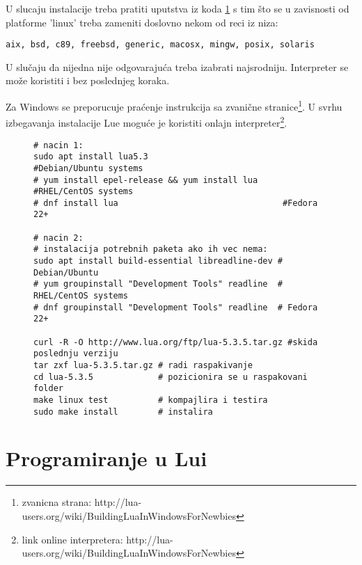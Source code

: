 \documentclass[a4paper]{article}
\begin{document}
U slucaju instalacije treba pratiti uputstva iz koda \ref{kod_instalacija} s tim što se u zavisnosti od platforme 'linux' treba zameniti doslovno nekom od reci iz niza:
\begin{verbatim}
aix, bsd, c89, freebsd, generic, macosx, mingw, posix, solaris
\end{verbatim}
 U slučaju da nijedna nije odgovarajuća treba izabrati najsrodniju. Interpreter se može koristiti i bez poslednjeg koraka.\cite{lua_org}

 Za Windows se preporucuje praćenje instrukcija sa zvanične stranice\footnote{zvanicna strana: http://lua-users.org/wiki/BuildingLuaInWindowsForNewbies}. U svrhu izbegavanja instalacije Lue moguće je koristiti onlajn interpreter\footnote{link online interpretera: http://lua-users.org/wiki/BuildingLuaInWindowsForNewbies}.

\begin{figure}

\begin{lstlisting}[caption={Instalacija iz terminala na linuxu},frame=single, label=simple]
# nacin 1:
sudo apt install lua5.3	                      #Debian/Ubuntu systems 
# yum install epel-release && yum install lua	#RHEL/CentOS systems 
# dnf install lua		                          #Fedora 22+

# nacin 2:
# instalacija potrebnih paketa ako ih vec nema:
sudo apt install build-essential libreadline-dev # Debian/Ubuntu
# yum groupinstall "Development Tools" readline	 # RHEL/CentOS systems 
# dnf groupinstall "Development Tools" readline	 # Fedora 22+

curl -R -O http://www.lua.org/ftp/lua-5.3.5.tar.gz #skida poslednju verziju
tar zxf lua-5.3.5.tar.gz # radi raspakivanje
cd lua-5.3.5             # pozicionira se u raspakovani folder 
make linux test          # kompajlira i testira
sudo make install        # instalira
\end{lstlisting}
\label{kod_instalacija}
\end{figure}

\section{Programiranje u Lui}
\label{sec:programiranje}

\end{document}
